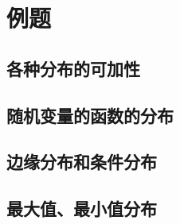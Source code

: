 
\section{例题}

\subsection{各种分布的可加性}


\subsection{随机变量的函数的分布}


\subsection{边缘分布和条件分布}


\subsection{最大值、最小值分布}

	